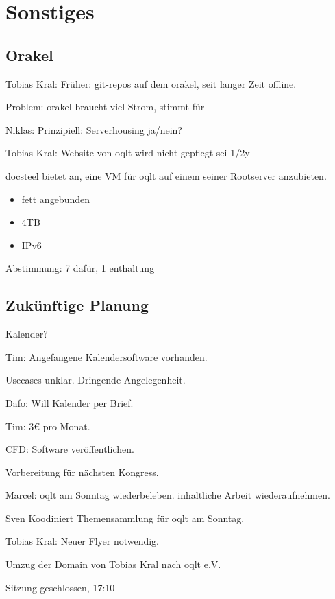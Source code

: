 \documentclass[parskip]{scrartcl}
\begin{document}
\section{Sonstiges}{

\subsection{Orakel}{

Tobias Kral:
Früher: git-repos auf dem orakel, seit langer Zeit offline.

Problem: orakel braucht viel Strom, stimmt für 

Niklas: Prinzipiell: Serverhousing ja/nein?

Tobias Kral: Website von oqlt wird nicht gepflegt sei 1/2y

docsteel bietet an, eine VM für oqlt auf einem seiner Rootserver anzubieten.
\begin{itemize}
\item{} fett angebunden
\item{} 4TB
\item{} IPv6
\end{itemize}

Abstimmung: 7 dafür, 1 enthaltung
}

\subsection{Zukünftige Planung}{

Kalender?

Tim: Angefangene Kalendersoftware vorhanden.

Usecases unklar.
Dringende Angelegenheit.

Dafo: Will Kalender per Brief.

Tim: 3€ pro Monat.

CFD:
Software veröffentlichen.

Vorbereitung für nächsten Kongress.

Marcel:
oqlt am Sonntag wiederbeleben.
inhaltliche Arbeit wiederaufnehmen.

Sven Koodiniert Themensammlung für oqlt am Sonntag.

Tobias Kral: Neuer Flyer notwendig.

Umzug der Domain von Tobias Kral nach oqlt e.V.

Sitzung geschlossen, 17:10

}
}
\end{document}
